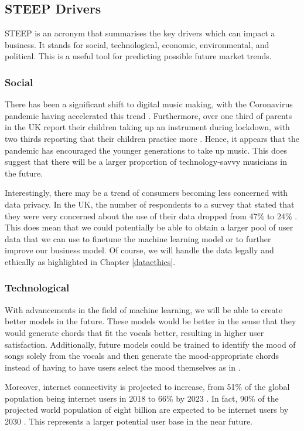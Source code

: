   \subsection{STEEP Drivers}

  STEEP is an acronym that summarises the key drivers which can impact a business. It stands for social, technological, economic, environmental, and political. This is a useful tool for predicting possible future market trends.

  \subsubsection{Social}
  There has been a significant shift to digital music making, with the Coronavirus pandemic having accelerated this trend \cite{abrsm2021}. Furthermore, over one third of parents in the UK report their children taking up an instrument during lockdown, with two thirds reporting that their children practice more \cite{abrsm2021}. Hence, it appears that the pandemic has encouraged the younger generations to take up music. This does suggest that there will be a larger proportion of technology-savvy musicians in the future.

  Interestingly, there may be a trend of consumers becoming less concerned with data privacy. In the UK, the number of respondents to a survey that stated that they were very concerned about the use of their data dropped from 47\% to 24\% \cite{DeloitteData}. This does mean that we could potentially be able to obtain a larger pool of user data that we can use to finetune the machine learning model or to further improve our business model. Of course, we will handle the data legally and ethically as highlighted in Chapter \ref{dataethics}.

  \subsubsection{Technological}
  With advancements in the field of machine learning, we will be able to create better models in the future. These models would be better in the sense that they would generate chords that fit the vocals better, resulting in higher user satisfaction. Additionally, future models could be trained to identify the mood of songs solely from the vocals and then generate the mood-appropriate chords instead of having to have users select the mood themselves as in \cite{MySong}.

  Moreover, internet connectivity is projected to increase, from 51\% of the global population being internet users in 2018 to 66\% by 2023 \cite{cisco_2022}. In fact, 90\% of the projected world population of eight billion are expected to be internet users by 2030 \cite{cybersecurityventures}. This represents a larger potential user base in the near future.

